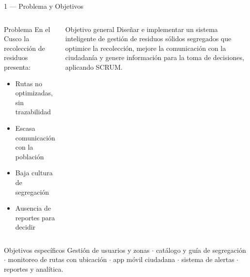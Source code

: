 \documentclass[aspectratio=169, 11pt]{beamer}
\begin{document}
\begin{frame}{1 — Problema y Objetivos}
    \vspace{-0.3cm}
    \begin{columns}[T]
    \begin{block}{Problema}
        \footnotesize
        En el Cusco la recolección de residuos presenta:
        \begin{itemize}
            \item Rutas no optimizadas, sin trazabilidad
            \item Escasa comunicación con la población
            \item Baja cultura de segregación
            \item Ausencia de reportes para decidir
        \end{itemize}
    \end{block}

    \begin{block}{Objetivo general}
        \footnotesize
        Diseñar e implementar un sistema inteligente de gestión de residuos sólidos segregados que optimice la recolección, mejore la comunicación con la ciudadanía y genere información para la toma de decisiones, aplicando SCRUM.
    \end{block}
    \end{columns}
    \vspace{0.15cm}
    \begin{block}{Objetivos específicos}
        \footnotesize
        Gestión de usuarios y zonas $\cdot$ catálogo y guía de segregación $\cdot$ monitoreo de rutas con ubicación $\cdot$ app móvil ciudadana $\cdot$ sistema de alertas $\cdot$ reportes y analítica.
    \end{block}
\end{frame}
\end{document}
